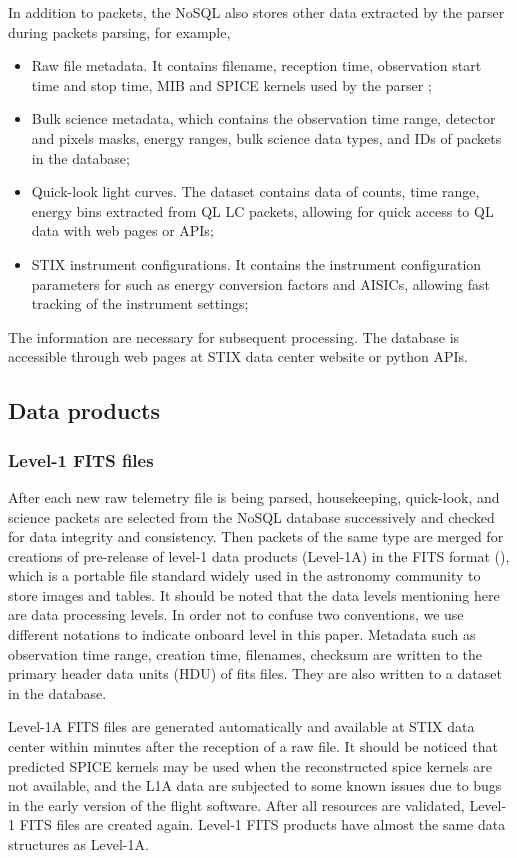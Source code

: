 \documentclass{aa}
\begin{document}
In addition to packets, the NoSQL also stores other data extracted by the parser during packets parsing, 
for example, 
\begin{itemize}
  \item Raw file metadata. It contains filename, reception time, observation start time and stop time, MIB and SPICE kernels used by the parser ; 
  \item Bulk science metadata, which contains the observation time range, detector and pixels masks, energy ranges, 
   bulk science data types, and IDs of packets in the database; 
  \item Quick-look light curves.  The dataset contains data of counts, time range, energy bins extracted from QL LC packets, 
     allowing for  quick access to QL data with web pages or APIs;
  \item STIX instrument configurations. 
  It contains the instrument configuration parameters for such as  energy conversion factors and AISICs, 
  allowing fast tracking of the instrument settings;
\end{itemize}
The information are necessary for subsequent processing. The
database is  accessible through web pages at STIX data center website or python APIs. 
\subsection{Data products}
\subsubsection{Level-1 FITS files}
After each new raw telemetry file is being parsed, 
housekeeping, quick-look, and science packets  
are selected from the NoSQL database successively 
and checked for data integrity and consistency. 
Then packets of the same type are merged for creations of pre-release of 
level-1 data products (Level-1A) 
 in the FITS format (\cite{fits}), 
which is a portable file standard widely used in the astronomy 
community to store images and tables.
It should be noted that the data levels mentioning here are data processing levels. 
In order not to confuse two conventions, we use different notations to indicate onboard level in this paper. 
Metadata such as observation time range, creation time, filenames,  checksum are written to 
the primary header data units (HDU) of fits files. 
They are also written to a dataset in the database.

Level-1A FITS files are generated automatically and available at STIX data center within minutes 
after the reception of a raw file.
It should be noticed that predicted SPICE kernels may be used when the reconstructed spice kernels  
are not available, and the L1A data are subjected to some known issues 
due to bugs in the early version of the flight software.
After all resources are validated,  Level-1  FITS files are created again. 
Level-1  FITS products have almost the same data structures as Level-1A.
\end{document}
